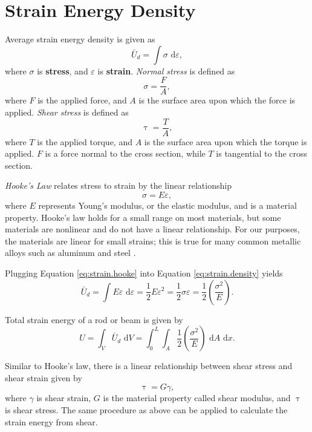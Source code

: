 \section{Strain Energy Density}
Average strain energy density is given as
\begin{equation}
\bar U_d = \int \sigma \text{ d}\varepsilon,
\label{eq:strain.density}
\end{equation}
where $\sigma$ is \textbf{stress}, and $\varepsilon$ is \textbf{strain}. \emph{Normal stress} is defined as
\begin{equation}
\sigma = \frac{F}{A},
\label{eq:stress.force}
\end{equation}
where $F$ is the applied force, and $A$ is the surface area upon which the force is applied. 
\emph{Shear stress} is defined as
\begin{equation}
\uptau = \frac{T}{A},
\end{equation}
where $T$ is the applied torque, and $A$ is the surface area upon which the torque is applied. $F$ is a force normal to the cross section, while $T$ is tangential to the cross section.

\emph{Hooke's Law} relates stress to strain by the linear relationship
\begin{equation}
\sigma = E\varepsilon,
\label{eq:strain.hooke}
\end{equation}
where $E$ represents Young's modulus, or the elastic modulus, and is a material property. Hooke's law holds for a small range on most materials, but some materials are nonlinear and do not have a linear relationship. For our purposes, the materials are linear for small strains; this is true for many common metallic alloys such as aluminum and steel \cite{boulderstrain5}.

Plugging Equation \ref{eq:strain.hooke} into Equation \ref{eq:strain.density} yields
\begin{equation}
\bar U_d = \int E\varepsilon\text{ d}\varepsilon = \frac{1}{2} E\varepsilon^2 = \frac{1}{2}\sigma\varepsilon = \frac{1}{2}\left(\frac{\sigma^2}{E}\right).
\label{eq:strain.energy.final}
\end{equation}

Total strain energy of a rod or beam is given by
\begin{equation}
U = \int_V\bar U_d \text{ d}V = \int_0^L\int_A\frac{1}{2}\left(\frac{\sigma^2}{E}\right)\text{ d}A\text{ d}x.
\end{equation}

Similar to Hooke's law, there is a linear relationship between shear stress and shear strain given by
\begin{equation}
\uptau = G\gamma,
\end{equation}
where $\gamma$ is shear strain, $G$ is the material property called shear modulus, and $\uptau$ is shear stress. The same procedure as above can be applied to calculate the strain energy from shear.

